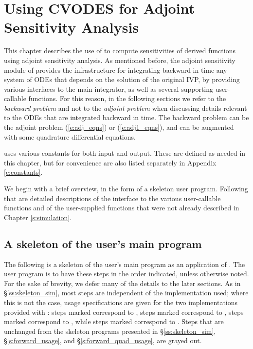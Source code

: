 \chapter{Using CVODES for Adjoint Sensitivity Analysis}\label{s:adjoint}

This chapter describes the use of {\cvodes} to compute sensitivities of derived 
functions using adjoint sensitivity analysis. As mentioned before, the adjoint
sensitivity module of {\cvodes} provides the infrastructure for integrating
backward in time any system of ODEs that depends on the solution of the original
IVP, by providing various interfaces to the main {\cvodes} integrator, as well 
as several supporting user-callable functions. For this reason, in the following
sections we refer to the {\em backward problem} and not to the 
{\em adjoint problem} when discussing details relevant to the ODEs that
are integrated backward in  time. The backward problem can be the adjoint problem
(\ref{e:adj_eqns}) or (\ref{e:adj1_eqns}), and
can be augmented with some quadrature differential equations.

{\cvodes} uses various constants for both input and output.  These are
defined as needed in this chapter, but for convenience are also listed
separately in Appendix \ref{c:constants}.

We begin with a brief overview, in the form of a skeleton user program.
Following that are detailed descriptions of the interface to the
various user-callable functions and of the user-supplied functions that were not
already described in Chapter \ref{s:simulation}.

\section{A skeleton of the user's main program}
\label{ss:skeleton_adj}

The following is a skeleton of the user's main program as an application of
{\cvodes}. The user program is to have these steps in the order indicated, 
unless otherwise noted. For the sake of brevity, we defer many of the details to 
the later sections.
As in \S\ref{ss:skeleton_sim}, most steps are independent of the {\nvector}
implementation used; where this is not the case, usage specifications are given for the
two implementations provided with {\cvodes}: steps marked {\p} correspond to 
{\nvecp}, steps marked {\omp} correspond to {\nvecopenmp}, steps
marked {\pt} correspond to {\nvecpthreads}, while steps marked {\s}
correspond to {\nvecs}. 
Steps that are unchanged from the skeleton programs presented in
\S\ref{ss:skeleton_sim}, \S\ref{s:forward_usage}, and \S\ref{s:forward_quad_usage},
are grayed out.

